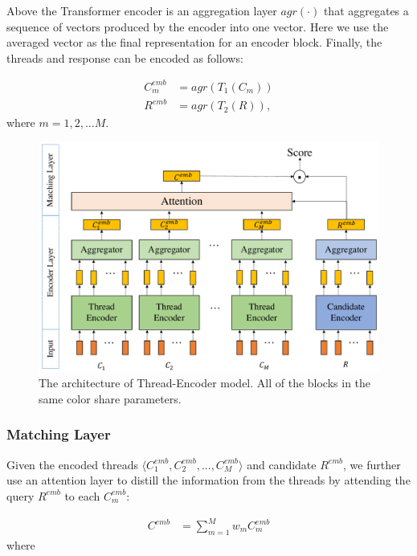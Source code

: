 Above the Transformer encoder is an aggregation layer $agr(\cdot)$ that aggregates
a sequence of vectors produced by the encoder into one vector. 
Here we use the averaged vector as the final representation for an encoder block. 
Finally, the threads and response can be encoded as follows:

\begin{equation}
\begin{aligned}
C^{emb}_m&=agr(T_1(C_m))\\
R^{emb}&=agr(T_2(R)),
\end{aligned}
\end{equation}
where $m=1,2,...M$.



\begin{figure}
	\centering
	\includegraphics[scale=0.32]{pic/model.pdf}
	\caption{The architecture of Thread-Encoder model. All of the blocks in the same color share parameters.}
	\label{fig:model1}
\end{figure}

\subsubsection{Matching Layer}

Given the encoded threads $\langle C^{emb}_1, C^{emb}_2, ..., C^{emb}_M\rangle$ and candidate $R^{emb}$, we further use an attention layer to distill the information from the threads by attending the query $R^{emb}$ to each $C_m^{emb}$:

\begin{equation}
\begin{aligned}
C^{emb}&=\sum_{m=1}^Mw_mC^{emb}_m
\end{aligned}
\end{equation}
where

